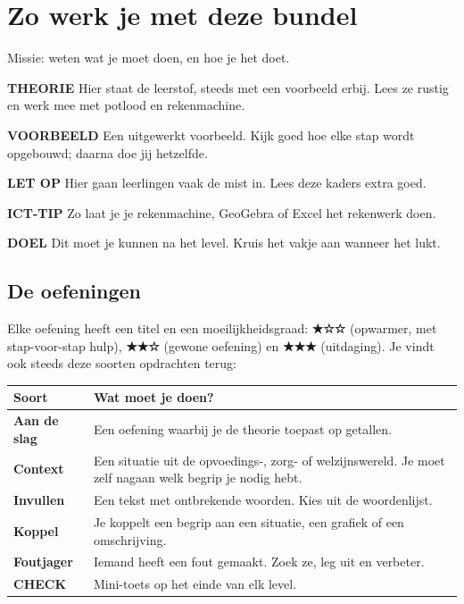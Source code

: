 \pagina

\section{Zo werk je met deze bundel}

\begin{missie}
Missie: weten wat je moet doen, en hoe je het doet.
\end{missie}

\begin{theorie}
\textbf{THEORIE} \quad Hier staat de leerstof, steeds met een voorbeeld erbij. Lees ze rustig en werk mee met potlood en rekenmachine.
\end{theorie}

\begin{voorbeeld}
\textbf{VOORBEELD} \quad Een uitgewerkt voorbeeld. Kijk goed hoe elke stap wordt opgebouwd; daarna doe jij hetzelfde.
\end{voorbeeld}

\begin{letop}
\textbf{LET OP} \quad Hier gaan leerlingen vaak de mist in. Lees deze kaders extra goed.
\end{letop}

\begin{ict}
\textbf{ICT-TIP} \quad Zo laat je je rekenmachine, GeoGebra of Excel het rekenwerk doen.
\end{ict}

\begin{doel}
\textbf{DOEL} \quad Dit moet je kunnen na het level. Kruis het vakje aan wanneer het lukt.
\end{doel}

\subsection*{De oefeningen}

Elke oefening heeft een titel en een moeilijkheidsgraad: \textbf{★☆☆} (opwarmer, met stap-voor-stap hulp), \textbf{★★☆} (gewone oefening) en \textbf{★★★} (uitdaging). Je vindt ook steeds deze soorten opdrachten terug:

\begin{tabular}{ll}
\hline
Soort & Wat moet je doen? \\
\hline
\textbf{Aan de slag} & Een oefening waarbij je de theorie toepast op getallen. \\
\textbf{Context} & Een situatie uit de opvoedings-, zorg- of welzijnswereld. Je moet zelf nagaan welk begrip je nodig hebt. \\
\textbf{Invullen} & Een tekst met ontbrekende woorden. Kies uit de woordenlijst. \\
\textbf{Koppel} & Je koppelt een begrip aan een situatie, een grafiek of een omschrijving. \\
\textbf{Foutjager} & Iemand heeft een fout gemaakt. Zoek ze, leg uit en verbeter. \\
\textbf{CHECK} & Mini-toets op het einde van elk level. \\
\hline
\end{tabular}

